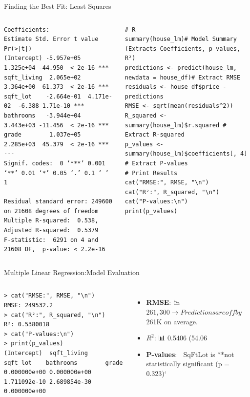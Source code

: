 \documentclass{beamer}
\begin{document}
		\begin{frame}[fragile]{Finding the Best Fit: Least Squares}
		\lstset{language=Python}
\begin{columns}
			\begin{lstlisting}
Coefficients:
Estimate Std. Error t value Pr(>|t|)    
(Intercept) -5.957e+05  1.325e+04 -44.950  < 2e-16 ***
sqft_living  2.065e+02  3.364e+00  61.373  < 2e-16 ***
sqft_lot    -2.664e-01  4.171e-02  -6.388 1.71e-10 ***
bathrooms   -3.944e+04  3.443e+03 -11.456  < 2e-16 ***
grade        1.037e+05  2.285e+03  45.379  < 2e-16 ***
---
Signif. codes:  0 ‘***’ 0.001 ‘**’ 0.01 ‘*’ 0.05 ‘.’ 0.1 ‘ ’ 1

Residual standard error: 249600 on 21608 degrees of freedom
Multiple R-squared:  0.538,	Adjusted R-squared:  0.5379 
F-statistic:  6291 on 4 and 21608 DF,  p-value: < 2.2e-16
		\end{lstlisting}
				
			\begin{lstlisting}
# R
summary(house_lm)# Model Summary (Extracts Coefficients, p-values, R²)
predictions <- predict(house_lm, newdata = house_df)# Extract RMSE
residuals <- house_df$price - predictions
RMSE <- sqrt(mean(residuals^2))
R_squared <- summary(house_lm)$r.squared # Extract R-squared
p_values <- summary(house_lm)$coefficients[, 4] # Extract P-values
# Print Results
cat("RMSE:", RMSE, "\n")
cat("R²:", R_squared, "\n")
cat("P-values:\n")
print(p_values)
			\end{lstlisting}
			
		\end{columns}
	\end{frame}


\begin{frame}[fragile]{Multiple Linear Regression:Model Evaluation}
	\begin{columns}
		\begin{lstlisting}
> cat("RMSE:", RMSE, "\n")
RMSE: 249532.2 
> cat("R²:", R_squared, "\n")
R²: 0.5380018 
> cat("P-values:\n")
> print(p_values)
(Intercept)  sqft_living     sqft_lot    bathrooms        grade 
0.000000e+00 0.000000e+00 1.711092e-10 2.689854e-30 0.000000e+00 
		\end{lstlisting}
		\begin{itemize}
			\item \textbf{RMSE}: 📉 $261,300 → Predictions are off by ~$261K on average.
			\item \textbf{$R^2$}: 📊 0.5406 (54.06%
			\item \textbf{P-values}: 🧪 SqFtLot is **not statistically significant (p = 0.323)`
		\end{itemize}
	\end{columns}
\end{frame}
	
\end{document}
